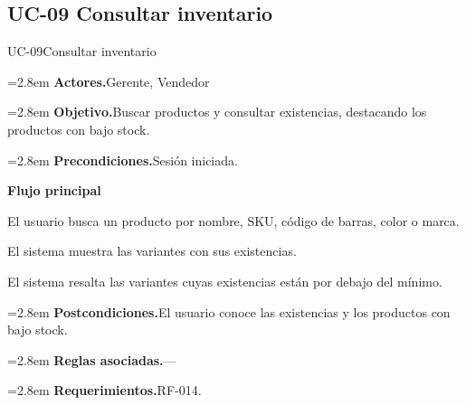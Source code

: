 \documentclass[11pt]{article}
\newcommand{\fila}[2]{\par\smallskip\noindent\hangindent=2.8em\hangafter=0
  \textbf{\sffamily\color{brand!80!black}#1.}\hspace{0.4em}#2\par}
\newcommand{\bloque}[1]{\par\smallskip\noindent\textbf{\sffamily\color{brand!80!black}#1}\par\nopagebreak}
\begin{document}
\subsection{UC-09 Consultar inventario}
\begin{ficha}{UC-09}{Consultar inventario}
\fila{Actores}{Gerente, Vendedor}
\fila{Objetivo}{Buscar productos y consultar existencias, destacando los productos con bajo stock.}
\fila{Precondiciones}{Sesión iniciada.}
\bloque{Flujo principal}
\begin{pasos}
  \item El usuario busca un producto por nombre, SKU, código de barras, color o marca.
  \item El sistema muestra las variantes con sus existencias.
  \item El sistema resalta las variantes cuyas existencias están por debajo del mínimo.
\end{pasos}
\fila{Postcondiciones}{El usuario conoce las existencias y los productos con bajo stock.}
\fila{Reglas asociadas}{---}
\fila{Requerimientos}{RF-014.}
\end{ficha}
\end{document}
